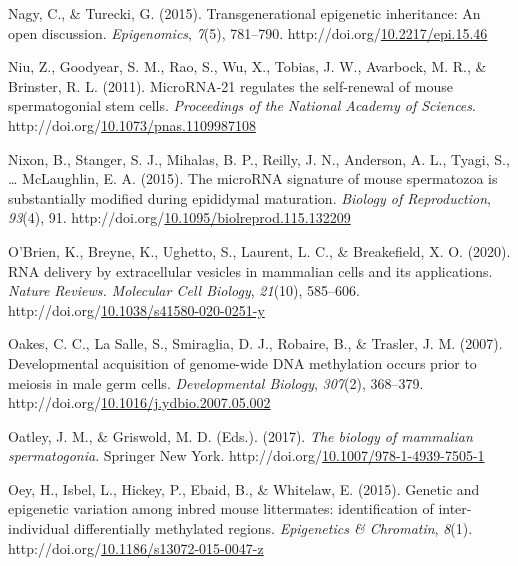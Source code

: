 \documentclass[12pt,twoside]{reedthesis}
\newlength{\cslhangindent}
\newenvironment{CSLReferences}[2] %
 {%
  \setlength{\parindent}{0pt}
  \ifodd #1 \everypar{\setlength{\hangindent}{\cslhangindent}}\ignorespaces\fi
  \ifnum #2 > 0
  \setlength{\parskip}{#2\baselineskip}
  \fi
 }%
 {}
\begin{document}
\begin{CSLReferences}{1}{0}
\leavevmode{}%
Nagy, C., \& Turecki, G. (2015). Transgenerational epigenetic inheritance: An open discussion. \emph{Epigenomics}, \emph{7}(5), 781--790. http://doi.org/\href{https://doi.org/10.2217/epi.15.46}{10.2217/epi.15.46}

\leavevmode{}%
Niu, Z., Goodyear, S. M., Rao, S., Wu, X., Tobias, J. W., Avarbock, M. R., \& Brinster, R. L. (2011). MicroRNA-21 regulates the self-renewal of mouse spermatogonial stem cells. \emph{Proceedings of the National Academy of Sciences}. http://doi.org/\href{https://doi.org/10.1073/pnas.1109987108}{10.1073/pnas.1109987108}

\leavevmode{}%
Nixon, B., Stanger, S. J., Mihalas, B. P., Reilly, J. N., Anderson, A. L., Tyagi, S., \ldots{} McLaughlin, E. A. (2015). The {microRNA} signature of mouse spermatozoa is substantially modified during epididymal maturation. \emph{Biology of Reproduction}, \emph{93}(4), 91. http://doi.org/\href{https://doi.org/10.1095/biolreprod.115.132209}{10.1095/biolreprod.115.132209}

\leavevmode{}%
O'Brien, K., Breyne, K., Ughetto, S., Laurent, L. C., \& Breakefield, X. O. (2020). RNA delivery by extracellular vesicles in mammalian cells and its applications. \emph{Nature Reviews. Molecular Cell Biology}, \emph{21}(10), 585--606. http://doi.org/\href{https://doi.org/10.1038/s41580-020-0251-y}{10.1038/s41580-020-0251-y}

\leavevmode{}%
Oakes, C. C., La Salle, S., Smiraglia, D. J., Robaire, B., \& Trasler, J. M. (2007). Developmental acquisition of genome-wide DNA methylation occurs prior to meiosis in male germ cells. \emph{Developmental Biology}, \emph{307}(2), 368--379. http://doi.org/\href{https://doi.org/10.1016/j.ydbio.2007.05.002}{10.1016/j.ydbio.2007.05.002}

\leavevmode{}%
Oatley, J. M., \& Griswold, M. D. (Eds.). (2017). \emph{The biology of mammalian spermatogonia}. Springer New York. http://doi.org/\href{https://doi.org/10.1007/978-1-4939-7505-1}{10.1007/978-1-4939-7505-1}

\leavevmode{}%
Oey, H., Isbel, L., Hickey, P., Ebaid, B., \& Whitelaw, E. (2015). Genetic and epigenetic variation among inbred mouse littermates: identification of inter-individual differentially methylated regions. \emph{Epigenetics \& Chromatin}, \emph{8}(1). http://doi.org/\href{https://doi.org/10.1186/s13072-015-0047-z}{10.1186/s13072-015-0047-z}


\end{CSLReferences}
\end{document}
